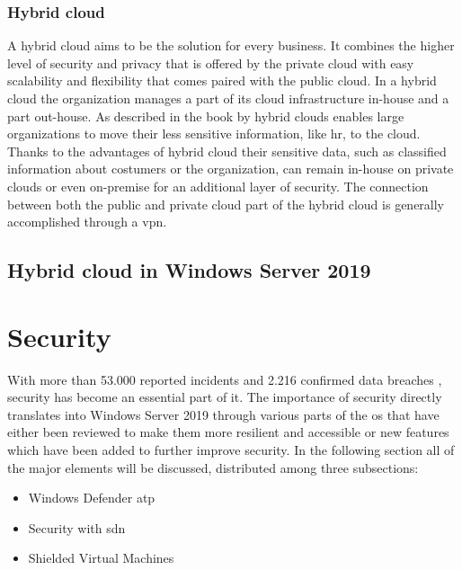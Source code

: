 \subsubsection{Hybrid cloud}
A hybrid cloud aims to be the solution for every business. It combines the higher level of security and privacy that is offered by the private cloud with easy scalability and flexibility that comes paired with the public cloud. In a hybrid cloud the organization manages a part of its cloud infrastructure in-house and a part out-house. As described in the book by \textcite{Sarna2010} hybrid clouds enables large organizations to move their less sensitive information, like \acrfull{hr}, to the cloud. Thanks to the advantages of hybrid cloud their sensitive data, such as classified information about costumers or the organization, can remain in-house on private clouds or even on-premise for an additional layer of security. The connection between both the public and private cloud part of the hybrid cloud is generally accomplished through a \acrfull{vpn}.


\subsection{Hybrid cloud in Windows Server 2019}

\section{Security}
With more than 53.000 reported incidents and 2.216 confirmed data breaches \autocite{Verizon2018}, security has become an essential part of \acrshort{it}. The importance of security directly translates into Windows Server 2019 through various parts of the \acrshort{os} that have either been reviewed to make them more resilient and accessible or new features which have been added to further improve security. In the following section all of the major elements will be discussed, distributed among three subsections:
\begin{itemize}
	\item Windows Defender \acrfull{atp}
	\item Security with \acrfull{sdn}
	\item Shielded Virtual Machines
\end{itemize}

